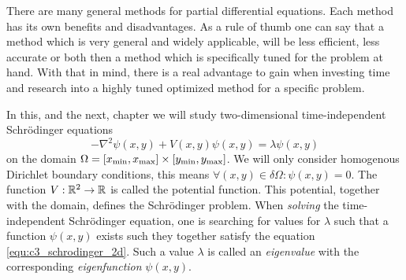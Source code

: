 



There are many general methods for partial differential equations. Each method has its own benefits and disadvantages. As a rule of thumb one can say that a method which is very general and widely applicable, will be less efficient, less accurate or both then a method which is specifically tuned for the problem at hand. With that in mind, there is a real advantage to gain when investing time and research into a highly tuned optimized method for a specific problem.

In this, and the next, chapter we will study two-dimensional time-independent Schrödinger equations
\begin{equation}\label{equ:c3_schrodinger_2d}
    -\nabla^2\psi(x, y) + V(x, y) \psi(x, y) = \lambda \psi(x, y)
\end{equation}
on the domain $\Omega = [{x_{\text{min}}}, {x_{\text{max}}}]\times[{y_{\text{min}}}, {y_{\text{max}}}]$. We will only consider homogenous Dirichlet boundary conditions, this means $\forall (x, y) \in \delta\Omega : \psi(x, y) = 0$. The function $V: \mathbb{R}^2 \to \mathbb{R}$ is called the potential function. This potential, together with the domain, defines the Schrödinger problem. When \emph{solving} the time-independent Schrödinger equation, one is searching for values for $\lambda$ such that a function $\psi(x, y)$  exists such they together satisfy the equation \eqref{equ:c3_schrodinger_2d}. Such a value $\lambda$ is called an \emph{eigenvalue} with the corresponding \emph{eigenfunction} $\psi(x, y)$.

